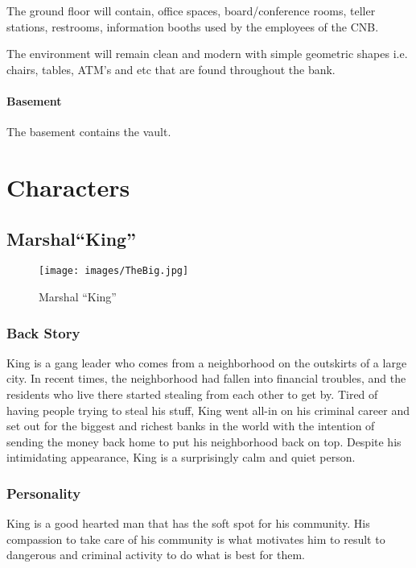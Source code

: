 \documentclass[11pt]{report}
\begin{document}
The ground floor will contain, office spaces, board/conference rooms, teller stations, restrooms, information booths used by the employees of the CNB.

The environment will remain clean and modern with simple geometric shapes i.e. chairs, tables, ATM’s and etc that are found throughout the bank.

\subsubsection{Basement}
The basement contains the vault.

\chapter{Characters}

\section{Marshal``King''}

\begin{figure}[H]
    \centering
    \texttt{[image: images/TheBig.jpg]}
    \caption{Marshal ``King''}
\end{figure}

\subsection{Back Story}

King is a gang leader who comes from a neighborhood on the outskirts of a large city. In recent times, the neighborhood had fallen into financial troubles, and the residents who live there started stealing from each other to get by. Tired of having people trying to steal his stuff, King went all-in on his criminal career and set out for the biggest and richest banks in the world with the intention of sending the money back home to put his neighborhood back on top. Despite his intimidating appearance, King is a surprisingly calm and quiet person.

\subsection{Personality}

King is a good hearted man that has the soft spot for his community. His compassion to take care of his community is what motivates him to result to dangerous and criminal activity to do what is best for them.
\end{document}
